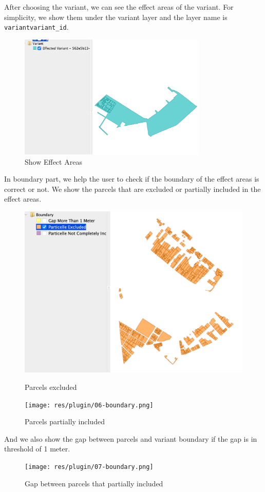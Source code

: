 After choosing the variant, we can see the effect areas of the variant.
For simplicity, we show them under the variant layer and the layer name is \texttt{variant\-variant\_id}.
\begin{figure}[H]
    \centering
    \includegraphics[width=0.8\textwidth]{res/plugin/04-show-areas}
    \caption{Show Effect Areas}
    \label{fig:pl-show-areas-2}
\end{figure}

In boundary part, we help the user to check if the boundary of the effect areas is correct or not.
We show the parcels that are excluded or partially included in the effect areas.
\begin{figure}[H]
    \centering
    \begin{minipage}{0.48\textwidth}
        \centering
        \includegraphics[width=\textwidth]{res/plugin/05-boundary}
        \caption{Parcels excluded}
        \label{fig:pl-boundary}
    \end{minipage}
    \hfill
    \begin{minipage}{0.48\textwidth}
        \centering
        \texttt{[image: res/plugin/06-boundary.png]}
        \caption{Parcels partially included}
        \label{fig:pl-boundary-2}
    \end{minipage}
\end{figure}

And we also show the gap between parcels and variant boundary if the gap is in threshold of 1 meter.
\begin{figure}[H]
    \centering
    \texttt{[image: res/plugin/07-boundary.png]}
    \caption{Gap between parcels that partially included}
    \label{fig:pl-boundary-3}
\end{figure}